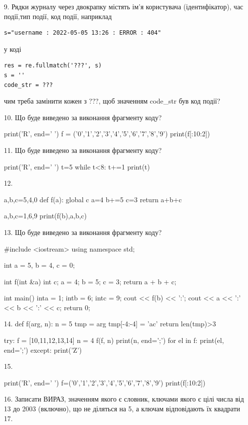 \documentclass[11pt]{article}
\begin{document}
9. 
Рядки журналу через двокрапку містять ім'я користувача (ідентифікатор), час події,тип події, код події, наприклад
\begin{verbatim}
s="username : 2022-05-05 13:26 : ERROR : 404"
\end{verbatim}
у коді 
\begin{verbatim}
res = re.fullmatch('???', s) 
s = ''
code_str = ??? 
\end{verbatim}
чим треба замінити кожен з ???, щоб значенням code\_str був код події? 



10. Що буде виведено за виконання фрагменту коду?

print('R', end=' ')
f = ('0','1','2','3','4','5','6','7','8','9')
print(f[:10:2])


11. Що буде виведено за виконання фрагменту коду?

print('R', end=' ')
t=5
while t<8:
    t+=1
print(t)


12. 

a,b,c=5,4,0
def f(a):
global c    a=4
    b+=5
    c=3
    return a+b+c

a,b,c=1,6,9
print(f(b),a,b,c)

13. Що буде виведено за виконання фрагменту коду?

#include <iostream>
using namespace std;

int a = 5, b = 4, c = 0;

int f(int &a){
int c;    a = 4;
    b = 5;
    c = 3;
    return a + b + c;
}

int main(){
    inta = 1;
    intb = 6;
    intc = 9;
    cout << f(b) << ':';
    cout << a << ':' << b << ':' << c;
    return 0; 
}

14. 
def f(arg, n):
    n = 5
    tmp = arg
    tmp[-4:-4] = 'ac'
    return len(tmp)>3

try:
    f = [10,11,12,13,14]
    n = 4
    f(f, n)
    print(n, end=';')
    for el in f:
        print(el, end=';')
except:
    print('Z')

15. 

print('R', end=' ')
f=('0','1','2','3','4','5','6','7','8','9')
print(f[:10:2])


16. 
Записати ВИРАЗ, значенням якого є словник, ключами якого є цілі числа від 13 до 2003 (включно), що не діляться на 5, а ключам відповідають їх квадрати 
17. 
\end{document}
